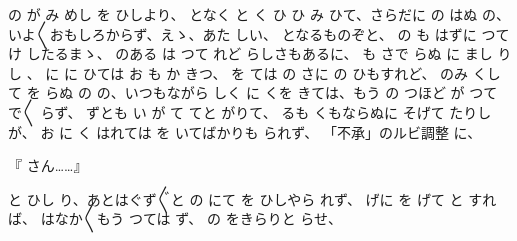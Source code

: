 の
が
み
めし
を
ひしより、
となく
と
く
ひ
ひ
み
ひて、さらだに
の
はぬ
の、いよ〳〵おもしろからず、えゝ、あた
しい、
となるものぞと、
の
も
はずに
つて
け
したるまゝ、
のある
は
つて
れど
らしさもあるに、
も
さで
らぬ
に
まし
りし
、
に
に
ひては
お
も
か
きつ、
を
ては
の
さに
の
ひもすれど、
のみ
くして
を
らぬ
の
の、いつもながら
しく
に
くを
きては、もう
の
つほど
が
つて
で〳〵
らず、
ずとも
い
が
て
てと
がりて、
るも
くもならぬに
そげて
たりしが、
お
に
く
はれては
を
いてばかりも
られず、
\ruby「不承」のルビ調整
に、

『
さん……』

と
ひし
り、あとはぐず〴〵と
の
にて
を
ひしやら
れず、
げに
を
げて
と
すれば、
はなか〳〵もう
つては
ず、
の
をきらりと
らせ、

